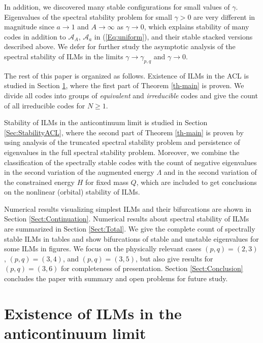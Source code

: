 \documentclass[12pt,reqno]{amsart}
\begin{document}
In addition, we discovered many stable configurations for small values of $\gamma$. Eigenvalues of the spectral stability problem for small $\gamma > 0$ are very different in magnitude since $a \to 1$ and $A \to \infty$ as $\gamma \to 0$, which explains stability of many codes in addition to $\mathcal{A}_A$, $\mathcal{A}_a$ in (\ref{Eq:uniform}), and their stable stacked versions described above. We defer for further study the asymptotic analysis of the spectral stability of ILMs in the limits $\gamma \to \gamma_{p,q}$ and $\gamma \to 0$.

The rest of this paper is organized as follows. Existence of ILMs in the ACL is studied in Section \ref{Sect:StatStates}, where the first part of Theorem \ref{th-main} is proven. We divide all codes into groups of {\em equivalent} and {\em irreducible} codes and give the count of all irreducible codes for $N \geq 1$. 

Stability of ILMs in the anticontinuum limit is studied in Section \ref{Sec:StabilityACL}, where the second part of Theorem \ref{th-main} is proven by using analysis of the truncated spectral stability problem and persistence of eigenvalues in the full spectral stability problem. Moreover, we combine the classification of the spectrally stable codes with the count of negative eigenvalues in the second variation of the augmented energy $\Lambda$ and in the second variation of the constrained energy $H$ for fixed mass $Q$, which are 
included to get conclusions on the nonlinear (orbital) stability of ILMs.

Numerical results visualizing simplest ILMs and their bifurcations are shown in Section \ref{Sect:Continuation}. Numerical results about spectral stability 
of ILMs are summarized in Section \ref{Sect:Total}. We give the complete count of spectrally stable ILMs in tables and show bifurcations of stable and unstable eigenvalues for some ILMs in figures. We focus on the physically relevant cases $(p,q) = (2,3)$, $(p,q) = (3,4)$, and $(p,q) = (3,5)$, but also give results for $(p,q) = (3,6)$ for completeness of presentation. Section \ref{Sect:Conclusion} concludes the paper with summary and open problems for future study.


\section{Existence of ILMs in the anticontinuum limit}
\label{Sect:StatStates}
\end{document}
